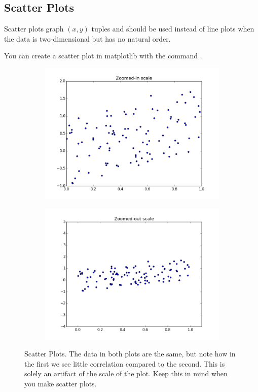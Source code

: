 \subsection*{Scatter Plots} 

Scatter plots graph $(x,y)$ tuples and should be used instead of line plots when the data is two-dimensional but has no natural order. 
 
You can create a scatter plot in matplotlib with the command .

\begin{figure}[h]
\centering
\begin{subfigure}{.45\textwidth}
\centering
\includegraphics[width=\textwidth]{scale_scatter_zoomed_in.png}
\end{subfigure}
\begin{subfigure}{.45\textwidth}
\centering
\includegraphics[width=\textwidth]{scale_scatter_zoomed_out.png}
\end{subfigure}
\caption{Scatter Plots.  The data in both plots are the same, but note how in the first we see little correlation compared to the second.  This is solely an artifact of the scale of the plot.  Keep this in mind when you make scatter plots.}
\label{fig:scatter_correlation}
\end{figure}


